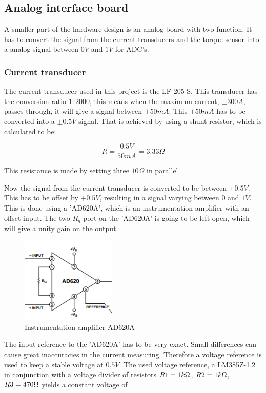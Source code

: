 	\subsection{Analog interface board}
	A smaller part of the hardware design is an analog board with two function: It has to convert the signal from the current transducers and the torque sensor into a analog signal between $0V$ and $1V$ for ADC's.
	
	\subsubsection{Current transducer}
	The current transducer used in this project is the LF 205-S. This transducer has the conversion ratio $1:2000$, this means when the maximum current, $\pm 300A$, passes through, it will give a signal between $\pm 50mA$. This $\pm 50mA$ has to be converted into a $\pm 0.5V$ signal. That is achieved by using a shunt resistor, which is calculated to be:
	
	\begin{equation}
		R = \frac{0.5V}{50mA} = 3.33\Omega
	\end{equation}
	
	This resistance is made by setting three $10 \Omega$ in parallel.

	Now the signal from the current transducer is converted to be between $\pm 0.5V$. This has to be offset by $+0.5V$, resulting in a signal varying between $0$ and $1V$. This is done using a 'AD620A', which is an instrumentation amplifier with an offset input. The two $R_g$ port on the 'AD620A' is going to be left open, which will give a unity gain on the output.
	
	\begin{figure}[H]
		\centering
		\includegraphics[width=0.4\textwidth]{pictures/hardware/Analog_Interface_board/AD620A.PNG}
		\caption{Instrumentation amplifier AD620A}
		\label{fig:AD620A}
	\end{figure} 
	
	The input reference to the 'AD620A' has to be very exact. Small differences can cause great inaccuracies in the current measuring. Therefore a voltage reference is used to keep a stable voltage at $0.5V$. The used voltage reference, a LM385Z-1.2 in conjunction with a voltage divider of resistors $R1 = 1k\ohm$, $R2 = 1k\ohm$, $R3 = 470\ohm$ yields a constant voltage of
	
